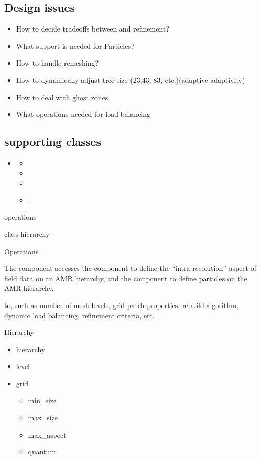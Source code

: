 \subsection{Design issues}

\begin{itemize}
    \item How to decide tradeoffs between  and 
      refinement?
    \item What support is needed for Particles?
    \item How to handle remeshing?
    \item How to dynamically adjust tree size (23,43, 83,
      etc.)(adaptive adaptivity)
    \item How to deal with ghost zones
    \item What operations needed for load balancing
\end{itemize}

\subsection{ supporting classes}

\begin{itemize}
    \item {}
    \begin{itemize}
          \item {}
          \item {}
          \item {}
          \item {}: 
    \end{itemize}
\end{itemize}

 operations

 class hierarchy

Operations

The  component accesses the  component to
define the ``intra-resolution'' aspect of field data on an AMR
hierarchy, and the  component to define particles on
the AMR hierarchy.  

to, such as number of mesh levels, grid patch properties,
rebuild algorithm, dynamic load balancing, refinement criteria, etc.

Hierarchy


\begin{itemize}
\item hierarchy
\item level
\item grid
\begin{itemize}
\item min\_size
\item max\_size
\item max\_aspect
\item quantum
\end{itemize}
\end{itemize}


